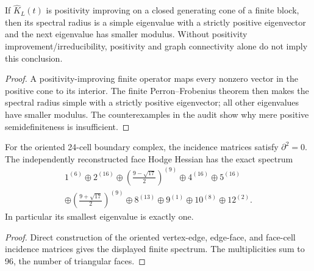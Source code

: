 \documentclass[12pt,a4paper]{article}
\begin{document}
\begin{corollary}
\label{p10:cor:finite-pure-glue-pf-gap-derived}
If \(\widehat K_L(t)\) is positivity improving on a closed generating cone of a finite block, then its spectral radius is a simple eigenvalue with a strictly positive eigenvector and the next eigenvalue has smaller modulus.  Without positivity improvement/irreducibility, positivity and graph connectivity alone do not imply this conclusion.
\end{corollary}
\begin{proof}
A positivity-improving finite operator maps every nonzero vector in the positive cone to its interior.  The finite Perron--Frobenius theorem then makes the spectral radius simple with a strictly positive eigenvector; all other eigenvalues have smaller modulus.  The counterexamples in the audit show why mere positive semidefiniteness is insufficient.
\end{proof}

\begin{theorem}
\label{p10:thm:finite-plaquette-hodge-curvature-hessian}
For the oriented 24-cell boundary complex, the incidence matrices satisfy \(\partial^2=0\).  The independently reconstructed face Hodge Hessian has the exact spectrum
\begin{equation}
\begin{split}
1^{(6)}\oplus2^{(16)}\oplus\left(\frac{9-\sqrt{17}}2\right)^{(9)}\oplus4^{(16)}\oplus5^{(16)}\\
\oplus\left(\frac{9+\sqrt{17}}2\right)^{(9)}\oplus8^{(13)}\oplus9^{(1)}\oplus10^{(8)}\oplus12^{(2)}.
\end{split}
\end{equation}
In particular its smallest eigenvalue is exactly one.
\end{theorem}
\begin{proof}
Direct construction of the oriented vertex-edge, edge-face, and face-cell incidence matrices gives the displayed finite spectrum.  The multiplicities sum to 96, the number of triangular faces.
\end{proof}
\end{document}
